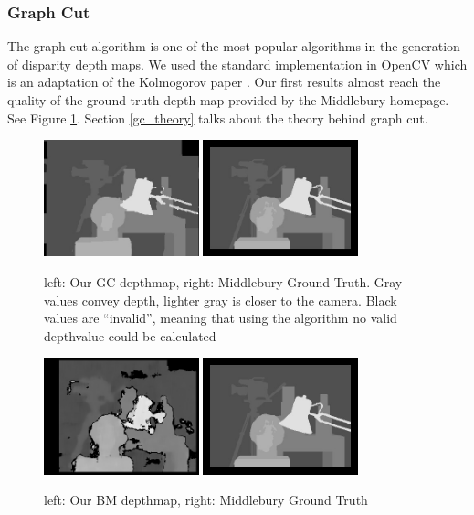 \documentclass[a4paper]{article}
\begin{document}
\subsubsection{Graph Cut}
The graph cut algorithm is one of the most popular algorithms in the
generation of disparity depth maps. We used the standard
implementation in OpenCV which is an adaptation of the Kolmogorov
paper \cite{kolmogorov2003}. Our first results almost reach the
quality of the ground truth depth map provided by the Middlebury
homepage\cite{middlebury}. See Figure \ref{gc_comp}.  Section
\ref{gc_theory} talks about the theory behind graph cut.

\begin{figure} [h!tb]
  \centering
  \includegraphics[width=0.4\textwidth]{gc_tsukuba_own}
  \includegraphics[width=0.4\textwidth]{disp_tsukuba_orig}
  \caption{left: Our GC depthmap, right: Middlebury Ground Truth. Gray values
  convey depth, lighter gray is closer to the camera. Black values are
  ``invalid'', meaning that using the algorithm no valid depthvalue could be
  calculated}
  \label{gc_comp}
\end{figure}

\begin{figure} [h!tb]
  \centering
  \includegraphics[width=0.4\textwidth]{bm_tsukuba_own}
  \includegraphics[width=0.4\textwidth]{disp_tsukuba_orig}
  \caption{left: Our BM depthmap, right: Middlebury Ground Truth}
  \label{bm_comp}
\end{figure}
\end{document}
